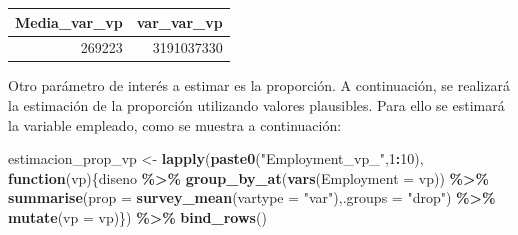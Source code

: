\documentclass[
  12pt,
]{book}
\newenvironment{Shaded}{\begin{snugshade}}{\end{snugshade}}
\newcommand{\AttributeTok}[1]{\textcolor[rgb]{0.13,0.29,0.53}{#1}}
\newcommand{\ControlFlowTok}[1]{\textcolor[rgb]{0.13,0.29,0.53}{\textbf{#1}}}
\newcommand{\DecValTok}[1]{\textcolor[rgb]{0.00,0.00,0.81}{#1}}
\newcommand{\FunctionTok}[1]{\textcolor[rgb]{0.13,0.29,0.53}{\textbf{#1}}}
\newcommand{\NormalTok}[1]{#1}
\newcommand{\OtherTok}[1]{\textcolor[rgb]{0.56,0.35,0.01}{#1}}
\newcommand{\SpecialCharTok}[1]{\textcolor[rgb]{0.81,0.36,0.00}{\textbf{#1}}}
\newcommand{\StringTok}[1]{\textcolor[rgb]{0.31,0.60,0.02}{#1}}
\begin{document}
\begin{Shaded}
\end{Shaded}

\begin{tabular}{r|r}
\hline
Media\_var\_vp & var\_var\_vp\\
\hline
269223 & 3191037330\\
\hline
\end{tabular}

Otro parámetro de interés a estimar es la proporción. A continuación, se realizará la estimación de la proporción utilizando valores plausibles. Para ello se estimará la variable empleado, como se muestra a continuación:

\begin{Shaded}
\begin{Highlighting}[]
\NormalTok{estimacion\_prop\_vp }\OtherTok{\textless{}{-}} \FunctionTok{lapply}\NormalTok{(}\FunctionTok{paste0}\NormalTok{(}\StringTok{"Employment\_vp\_"}\NormalTok{,}\DecValTok{1}\SpecialCharTok{:}\DecValTok{10}\NormalTok{),}
       \ControlFlowTok{function}\NormalTok{(vp)\{diseno }\SpecialCharTok{\%\textgreater{}\%} \FunctionTok{group\_by\_at}\NormalTok{(}\FunctionTok{vars}\NormalTok{(}\AttributeTok{Employment =}\NormalTok{ vp)) }\SpecialCharTok{\%\textgreater{}\%} 
  \FunctionTok{summarise}\NormalTok{(}\AttributeTok{prop =} \FunctionTok{survey\_mean}\NormalTok{(}\AttributeTok{vartype =} \StringTok{"var"}\NormalTok{),}\AttributeTok{.groups =} \StringTok{"drop"}\NormalTok{) }\SpecialCharTok{\%\textgreater{}\%}
         \FunctionTok{mutate}\NormalTok{(}\AttributeTok{vp =}\NormalTok{ vp)\}) }\SpecialCharTok{\%\textgreater{}\%} \FunctionTok{bind\_rows}\NormalTok{()}
\end{Highlighting}
\end{Shaded}
\end{document}
